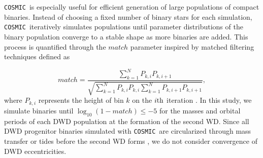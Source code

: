 \documentclass[twocolumn]{aastex631}
\newcommand{\cosmic}{\texttt{COSMIC}}
\begin{document}
\cosmic\ is especially useful for efficient generation of large populations of compact binaries. Instead of choosing a fixed number of binary stars for each simulation, \cosmic\ iteratively simulates populations until parameter distributions of the binary population converge to a stable shape as more binaries are added. This process is quantified through the $match$ parameter inspired by matched filtering techniques \citep[e.g. Eq. 6 of ][]{Chatziioannou2017} defined as

\begin{equation}
   match = \frac{\sum_{k=1}^{N}P_{k,i}P_{k,i+1}}{\sqrt{\sum_{k=1}^{N}P_{k,i}P_{k,i}\sum_{k=1}^{N}P_{k,i+1}P_{k,i+1}}},
\end{equation}
where $P_{k,i}$ represents the height of bin $k$ on the $i\rm{th}$ iteration \citep{Breivik2020a}. In this study, we simulate binaries until $\log_{10}(1-match) \leq -5$ for the masses and orbital periods of each DWD population at the formation of the second WD. Since all DWD progenitor binaries simulated with \cosmic\ are circularized through mass transfer or tides before the second WD forms \citep[e.g.][]{Marsh2004, Gokhale2007, Sepinsky2014, Kremer2015}, we do not consider convergence of DWD eccentricities.


\end{document}

